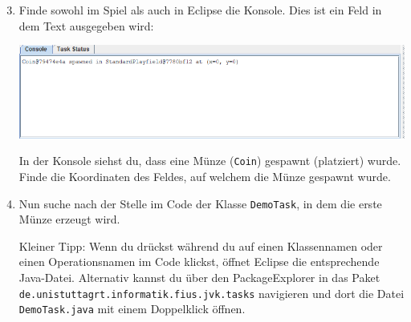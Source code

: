 \begin{enumerate}\setcounter{enumi}{2}

    \item Finde sowohl im Spiel als auch in Eclipse die Konsole. Dies ist ein Feld in dem Text ausgegeben wird:
    \begin{center}
        \includegraphics[width=\linewidth]{./figures/console.PNG}
    \end{center}

    In der Konsole siehst du, dass eine Münze (\texttt{Coin}) gespawnt (platziert) wurde. 
    Finde die Koordinaten des Feldes, auf welchem die Münze gespawnt wurde.

    \item Nun suche nach der Stelle im Code der Klasse \lstinline{DemoTask}, in dem die erste Münze erzeugt wird.
    
        Kleiner Tipp: 
        Wenn du  drückst während du auf einen Klassennamen oder einen Operationsnamen im Code klickst, öffnet Eclipse die entsprechende Java-Datei.
        Alternativ kannst du über den PackageExplorer in das Paket \texttt{de.unistuttagrt.informatik.fius.jvk.tasks} navigieren und dort die Datei \texttt{DemoTask.java} mit einem Doppelklick öffnen.
\end{enumerate}
